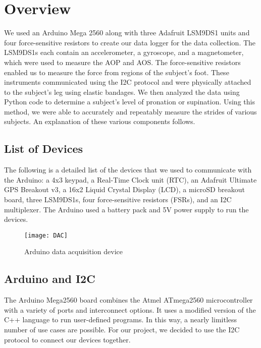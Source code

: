 \section{Overview}
We used an Arduino Mega 2560 along with three Adafruit LSM9DS1 units and four force-sensitive resistors to create our data logger for the data collection.
The LSM9DS1s each contain an accelerometer, a gyroscope, and a magnetometer, which were used to measure the AOP and AOS.
The force-sensitive resistors enabled us to measure the force from regions of the subject’s foot.
These instruments communicated using the I2C protocol and were physically attached to the subject’s leg using elastic bandages.
We then analyzed the data using Python code to determine a subject’s level of pronation or supination.
Using this method, we were able to accurately and repeatably measure the strides of various subjects.
An explanation of these various components follows.\par

\subsection{List of Devices}
The following is a detailed list of the devices that we used to communicate with the Arduino: a 4x3 keypad, a Real-Time Clock unit (RTC), an Adafruit Ultimate GPS Breakout v3, a 16x2 Liquid Crystal Display (LCD), a microSD breakout board, three LSM9DS1s, four force-sensitive resistors (FSRs), and an I2C multiplexer.
The Arduino used a battery pack and 5V power supply to run the devices.\par

\begin{figure}[h]
  \centering
  \texttt{[image: DAC]}
  \caption[DAC]{Arduino data acquisition device}
  \label{fig:x dac}
\end{figure}

\subsection{Arduino and I2C}
The Arduino Mega2560 board combines the Atmel ATmega2560 microcontroller with a variety of ports and interconnect options.
It uses a modified version of the C++ language to run user-defined programs.
In this way, a nearly limitless number of use cases are possible.
For our project, we decided to use the I2C protocol to connect our devices together.\par

